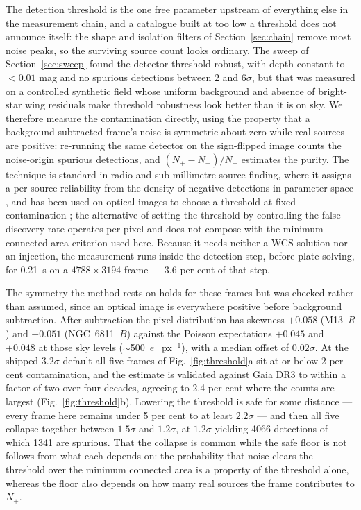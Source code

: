 \documentclass[fleqn,usenatbib]{mnras}
\begin{document}
The detection threshold is the one free parameter upstream of everything else in the measurement chain, and a catalogue built at too low a threshold does not announce itself: the shape and isolation filters of Section~\ref{sec:chain} remove most noise peaks, so the surviving source count looks ordinary. The sweep of Section~\ref{sec:sweep} found the detector threshold-robust, with depth constant to $<0.01$ mag and no spurious detections between $2$ and $6\sigma$, but that was measured on a controlled synthetic field whose uniform background and absence of bright-star wing residuals make threshold robustness look better than it is on sky. We therefore measure the contamination directly, using the property that a background-subtracted frame's noise is symmetric about zero while real sources are positive: re-running the same detector on the sign-flipped image counts the noise-origin spurious detections, and $(N_+-N_-)/N_+$ estimates the purity. The technique is standard in radio and sub-millimetre source finding, where it assigns a per-source reliability from the density of negative detections in parameter space \citep{serra2012, serra2015}, and has been used on optical images to choose a threshold at fixed contamination \citep{molino2014}; the alternative of setting the threshold by controlling the false-discovery rate \citep{hopkins2002} operates per pixel and does not compose with the minimum-connected-area criterion used here. Because it needs neither a WCS solution nor an injection, the measurement runs inside the detection step, before plate solving, for 0.21~s on a $4788\times3194$ frame --- 3.6 per cent of that step.

The symmetry the method rests on holds for these frames but was checked rather than assumed, since an optical image is everywhere positive before background subtraction. After subtraction the pixel distribution has skewness $+0.058$ (M13~$R$) and $+0.051$ (NGC~6811~$B$) against the Poisson expectations $+0.045$ and $+0.048$ at those sky levels ($\sim$500~$e^-$\,px$^{-1}$), with a median offset of $0.02\sigma$. At the shipped $3.2\sigma$ default all five frames of Fig.~\ref{fig:threshold}a sit at or below 2 per cent contamination, and the estimate is validated against Gaia DR3 to within a factor of two over four decades, agreeing to 2.4 per cent where the counts are largest (Fig.~\ref{fig:threshold}b). Lowering the threshold is safe for some distance --- every frame here remains under 5 per cent to at least $2.2\sigma$ --- and then all five collapse together between $1.5\sigma$ and $1.2\sigma$, at $1.2\sigma$ yielding 4066 detections of which 1341 are spurious. That the collapse is common while the safe floor is not follows from what each depends on: the probability that noise clears the threshold over the minimum connected area is a property of the threshold alone, whereas the floor also depends on how many real sources the frame contributes to $N_+$.
\end{document}
